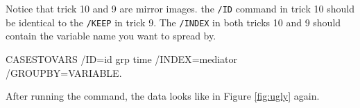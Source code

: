 \documentclass[
]{book}
\newenvironment{Shaded}{\begin{snugshade}}{\end{snugshade}}
\newcommand{\NormalTok}[1]{#1}
\newcommand{\OtherTok}[1]{\textcolor[rgb]{0.56,0.35,0.01}{#1}}
\newcommand{\SpecialCharTok}[1]{\textcolor[rgb]{0.00,0.00,0.00}{#1}}
\begin{document}
Notice that trick 10 and 9 are mirror images. the \texttt{/ID} command in trick 10 should be identical to the \texttt{/KEEP} in trick 9. The \texttt{/INDEX} in both tricks 10 and 9 should contain the variable name you want to spread by.

\begin{Shaded}
\begin{Highlighting}[]
\NormalTok{CASESTOVARS}
  \SpecialCharTok{/}\NormalTok{ID}\OtherTok{=}\NormalTok{id grp time}
  \SpecialCharTok{/}\NormalTok{INDEX}\OtherTok{=}\NormalTok{mediator}
  \SpecialCharTok{/}\NormalTok{GROUPBY}\OtherTok{=}\NormalTok{VARIABLE.}
\end{Highlighting}
\end{Shaded}

After running the command, the data looks like in Figure \ref{fig:ugly} again.

  
\end{document}
